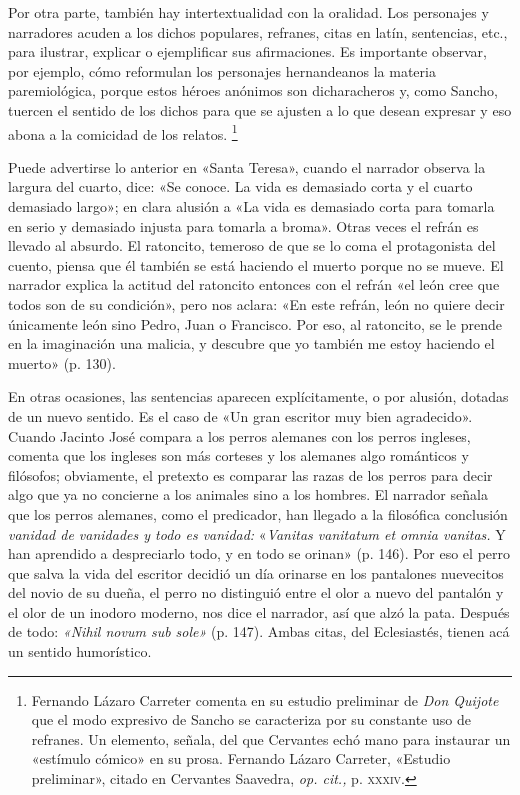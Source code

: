 \documentclass[14pt,twoside,final]{extbook} %
\let\oldfootnote\footnote
\renewcommand\footnote[1]{%
\oldfootnote{\hspace{1mm}#1}}
\begin{document}
Por otra parte, también hay intertextualidad con la oralidad. Los personajes y narradores acuden a los dichos populares, refranes, citas en latín, sentencias, etc., para ilustrar, explicar o ejemplificar sus afirmaciones. Es importante observar, por ejemplo, cómo reformulan los personajes hernandeanos la materia paremiológica, porque estos héroes anónimos son dicharacheros y, como Sancho, tuercen el sentido de los dichos para que se ajusten a lo que desean expresar y eso abona a la comicidad de los relatos.\footnote{Fernando Lázaro Carreter comenta en su estudio preliminar de \emph{Don Quijote} que el modo expresivo de Sancho se caracteriza por su constante uso de refranes. Un elemento, señala, del que Cervantes echó mano para instaurar un «estímulo cómico» en su prosa. Fernando Lázaro Carreter, «Estudio preliminar», citado en Cervantes Saavedra, \emph{op. cit.,} p. \textsc{xxxiv}.}

Puede advertirse lo anterior en «Santa Teresa», cuando el narrador observa la largura del cuarto, dice: «Se conoce. La vida es demasiado corta y el cuarto demasiado largo»; en clara alusión a «La vida es demasiado corta para tomarla en serio y demasiado injusta para tomarla a broma». Otras veces el refrán es llevado al absurdo. El ratoncito, temeroso de que se lo coma el protagonista del cuento, piensa que él también se está haciendo el muerto porque no se mueve. El narrador explica la actitud del ratoncito entonces con el refrán «el león cree que todos son de su condición», pero nos aclara: «En este refrán, león no quiere decir únicamente león sino Pedro, Juan o Francisco. Por eso, al ratoncito, se le prende en la imaginación una malicia, y descubre que yo también me estoy haciendo el muerto» (p. 130).

En otras ocasiones, las sentencias aparecen explícitamente, o por alusión, dotadas de un nuevo sentido. Es el caso de «Un gran escritor muy bien agradecido». Cuando Jacinto José compara a los perros alemanes con los perros ingleses, comenta que los ingleses son más corteses y los alemanes algo románticos y filósofos; obviamente, el pretexto es comparar las razas de los perros para decir algo que ya no concierne a los animales sino a los hombres. El narrador señala que los perros alemanes, como el predicador, han llegado a la filosófica conclusión \emph{vanidad de vanidades y todo es vanidad:} «\emph{Vanitas vanitatum et omnia vanitas.} Y han aprendido a despreciarlo
todo, y en todo se orinan» (p. 146). Por eso el perro que salva la vida del escritor decidió un día orinarse en los pantalones nuevecitos del novio de su dueña, el perro no distinguió entre el olor a nuevo del pantalón y el olor de un inodoro moderno, nos dice el narrador, así que alzó la pata. Después de todo: \emph{«Nihil novum sub sole»} (p. 147). Ambas citas, del Eclesiastés, tienen acá un sentido humorístico.
\end{document}
